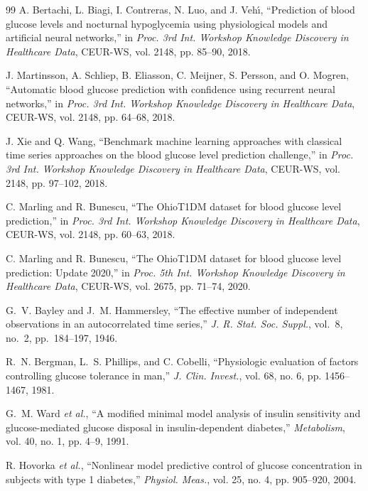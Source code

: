 \documentclass[journal]{IEEEtran}
\begin{document}
\begin{thebibliography}{99}
\label{ref58label} A. Bertachi, L. Biagi, I. Contreras, N. Luo, and J. Veh\'{\i}, ``Prediction of blood glucose levels and nocturnal hypoglycemia using physiological models and artificial neural networks,'' in \emph{Proc. 3rd Int. Workshop Knowledge Discovery in Healthcare Data}, CEUR-WS, vol. 2148, pp. 85--90, 2018.

\label{ref56label} J. Martinsson, A. Schliep, B. Eliasson, C. Meijner, S. Persson, and O. Mogren, ``Automatic blood glucose prediction with confidence using recurrent neural networks,'' in \emph{Proc. 3rd Int. Workshop Knowledge Discovery in Healthcare Data}, CEUR-WS, vol. 2148, pp. 64--68, 2018.

\label{ref57label} J. Xie and Q. Wang, ``Benchmark machine learning approaches with classical time series approaches on the blood glucose level prediction challenge,'' in \emph{Proc. 3rd Int. Workshop Knowledge Discovery in Healthcare Data}, CEUR-WS, vol. 2148, pp. 97--102, 2018.

\label{ref30label} C. Marling and R. Bunescu, ``The OhioT1DM dataset for blood glucose level prediction,'' in \emph{Proc. 3rd Int. Workshop Knowledge Discovery in Healthcare Data}, CEUR-WS, vol. 2148, pp. 60--63, 2018.

\label{ref31label} C. Marling and R. Bunescu, ``The OhioT1DM dataset for blood glucose level prediction: Update 2020,'' in \emph{Proc. 5th Int. Workshop Knowledge Discovery in Healthcare Data}, CEUR-WS, vol. 2675, pp. 71--74, 2020.

\label{refBHlabel} G.~V. Bayley and J.~M. Hammersley, ``The effective number of independent observations in an autocorrelated time series,'' \emph{J. R. Stat. Soc. Suppl.}, vol.~8, no.~2, pp.~184--197, 1946.

\label{ref32label} R.~N. Bergman, L.~S. Phillips, and C. Cobelli, ``Physiologic evaluation of factors controlling glucose tolerance in man,'' \emph{J. Clin. Invest.}, vol. 68, no. 6, pp. 1456--1467, 1981.

\label{ref33label} G.~M. Ward \emph{et al.}, ``A modified minimal model analysis of insulin sensitivity and glucose-mediated glucose disposal in insulin-dependent diabetes,'' \emph{Metabolism}, vol. 40, no. 1, pp. 4--9, 1991.

\label{ref34label} R. Hovorka \emph{et al.}, ``Nonlinear model predictive control of glucose concentration in subjects with type 1 diabetes,'' \emph{Physiol. Meas.}, vol. 25, no. 4, pp. 905--920, 2004.


\end{thebibliography}
\end{document}
